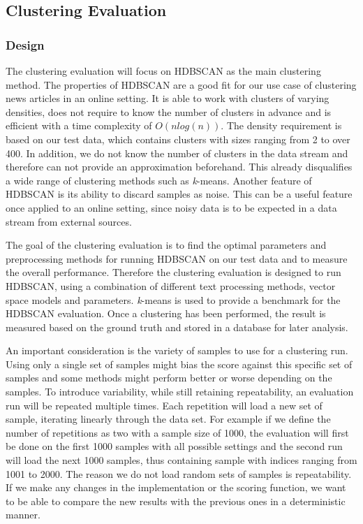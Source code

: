 \subsection{Clustering Evaluation}
\label{subsec:4b_clustering_evaluation}

\subsubsection{Design}
\label{subsubsec:4b_design}

The clustering evaluation will focus on HDBSCAN as the main clustering method. 
The properties of HDBSCAN are a good fit for our use case of clustering news articles in an online setting.
It is able to work with clusters of varying densities, 
does not require to know the number of clusters in advance 
and is efficient with a time complexity of $O(nlog(n))$.
The density requirement is based on our test data, which contains clusters with sizes ranging from 2 to over 400. 
In addition, we do not know the number of clusters in the data stream and therefore can not provide an approximation
beforehand. This already disqualifies a wide range of clustering methods such as \textit{k}-means. 
Another feature of HDBSCAN is its ability to discard samples as noise. 
This can be a useful feature once applied to an online setting, 
since noisy data is to be expected in a data stream from external sources. 

The goal of the clustering evaluation is to find the optimal parameters and preprocessing methods
for running HDBSCAN on our test data and to measure the overall performance.
Therefore the clustering evaluation is designed to run HDBSCAN,
using a combination of different text processing methods, vector space models and parameters.
\textit{k}-means is used to provide a benchmark for the HDBSCAN evaluation.
Once a clustering has been performed,
the result is measured based on the ground truth and stored in a database for later analysis.

An important consideration is the variety of samples to use for a clustering run.
Using only a single set of samples might bias the score against this specific set of samples
and some methods might perform better or worse depending on the samples.
To introduce variability, while still retaining repeatability, an evaluation run will be repeated multiple times.
Each repetition will load a new set of sample, iterating linearly through the data set.
For example if we define the number of repetitions as two with a sample size of 1000,
the evaluation will first be done on the first 1000 samples with all possible settings
and the second run will load the next 1000 samples, thus containing sample with indices ranging from 1001 to 2000.
The reason we do not load random sets of samples is repeatability.
If we make any changes in the implementation or the scoring function,
we want to be able to compare the new results with the previous ones in a deterministic manner.


